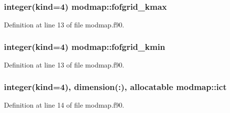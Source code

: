 \subsubsection[{\texorpdfstring{fofgrid\+\_\+kmax}{fofgrid_kmax}}]{\setlength{\rightskip}{0pt plus 5cm}integer(kind=4) modmap\+::fofgrid\+\_\+kmax}\hypertarget{namespacemodmap_a7273a00ef7481fa382b6016d39a752e3}{}\label{namespacemodmap_a7273a00ef7481fa382b6016d39a752e3}


Definition at line 13 of file modmap.\+f90.

\subsubsection[{\texorpdfstring{fofgrid\+\_\+kmin}{fofgrid_kmin}}]{\setlength{\rightskip}{0pt plus 5cm}integer(kind=4) modmap\+::fofgrid\+\_\+kmin}\hypertarget{namespacemodmap_ac4f40bdda34481044d92691776976abc}{}\label{namespacemodmap_ac4f40bdda34481044d92691776976abc}


Definition at line 13 of file modmap.\+f90.

\subsubsection[{\texorpdfstring{ict}{ict}}]{\setlength{\rightskip}{0pt plus 5cm}integer(kind=4), dimension(\+:), allocatable modmap\+::ict}\hypertarget{namespacemodmap_af68652ecce879493f3a84180017cccbd}{}\label{namespacemodmap_af68652ecce879493f3a84180017cccbd}


Definition at line 14 of file modmap.\+f90.

